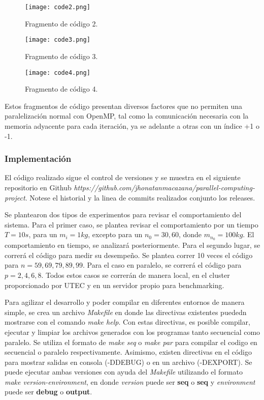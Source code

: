 \begin{figure}
	\centering
	\texttt{[image: code2.png]}
	\caption{Fragmento de código 2.}
	\label{fig:code2}
\end{figure}


\begin{figure}
	\centering
	\texttt{[image: code3.png]}
	\caption{Fragmento de código 3.}
	\label{fig:code3}
\end{figure}

\begin{figure}
	\centering
	\texttt{[image: code4.png]}
	\caption{Fragmento de código 4.}
	\label{fig:code4}
\end{figure}

Estos fragmentos de código presentan diversos factores que no permiten una paralelización normal con OpenMP, tal como la comunicación necesaria con la memoria adyacente para cada iteración, ya se adelante a otras con un índice +1 o -1.

\subsubsection{Implementación}
El código realizado sigue el control de versiones  y se muestra en el siguiente repositorio en Github \textit{https://github.com/jhonatanmacazana/parallel-computing-project}. Notese el historial y la linea de commits realizados conjunto los releases.

Se plantearon dos tipos de experimentos para revisar el comportamiento del sistema. Para el primer caso, se plantea revisar el comportamiento por un tiempo $T = 10s$, para un $m_i = 1 kg$, excepto para un $n_0 = 30, 60$, donde $m_{n_0} = 100 kg$. El comportamiento en tiempo, se analizará posteriormente. Para el segundo lugar, se correrá el código para medir su desempeño. Se plantea correr 10 veces el código para $n={59,69,79,89,99}$. Para el caso en paralelo, se correrá el código para $p={2,4,6,8}$. Todos estos casos se correrán de manera local, en el cluster proporcionado por UTEC y en un servidor propio para benchmarking.

Para agilizar el desarrollo y poder compilar en diferentes entornos de manera simple, se crea un archivo \textit{Makefile} en donde las directivas existentes puededn mostrarse con el comando \textit{make help}. Con estas directivas, es posible compilar, ejecutar y limpiar los archivos generados con los programas tanto secuencial como paralelo. Se utiliza el formato de \textit{make seq} o \textit{make par} para compilar el codigo en secuencial o paralelo respectivamente. Asimismo, existen directivas en el código para mostrar salidas en consola (-DDEBUG) o en un archivo (-DEXPORT). Se puede ejecutar ambas versiones con ayuda del \textit{Makefile} utilizando el formato \textit{make version-environment}, en donde \textit{version} puede ser \textbf{seq} o \textbf{seq} y \textit{environment} puede ser \textbf{debug} o \textbf{output}. 

